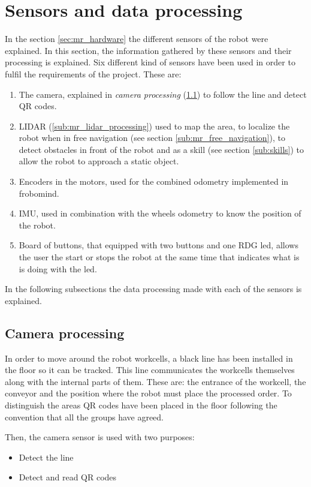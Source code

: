 \section{Sensors and data processing} %
\label{sec:mr_sensors_and_data_processing}
In the section \ref{sec:mr_hardware} the different sensors of the robot were explained.
In this section, the information gathered by these sensors and their processing is explained.
Six different kind of sensors have been used in order to fulfil the requirements of the project.
These are:
\begin{enumerate}
	\item The camera, explained in \emph{camera processing} (\ref{sub:mr_camera_processing}) to follow the line and detect QR codes.
	\item LIDAR (\ref{sub:mr_lidar_processing}) used to map the area, to localize the robot when in free navigation (see section \ref{sub:mr_free_navigation}), to detect obstacles in front of the robot and as a skill (see section \ref{sub:skills}) to allow the robot to approach a static object.
	\item Encoders in the motors, used for the combined odometry implemented in frobomind.
	\item IMU, used in combination with the wheels odometry to know the position of the robot.
	\item Board of buttons, that equipped with two buttons and one RDG led, allows the user the start or stops the robot at the same time that indicates what is is doing with the led.
\end{enumerate}
In the following subsections the data processing made with each of the sensors is explained.

	\subsection{Camera processing} %
	\label{sub:mr_camera_processing}
	In order to move around the robot workcells, a black line has been installed in the floor so it can be tracked.
	This line communicates the workcells themselves along with the internal parts of them. 
	These are: the entrance of the workcell, the conveyor and the position where the robot must place the processed order.
	To distinguish the areas QR codes have been placed in the floor following the convention that all the groups have agreed.

	Then, the camera sensor is used with two purposes:
	\begin{itemize}
		\item Detect the line
		\item Detect and read QR codes
	\end{itemize}

